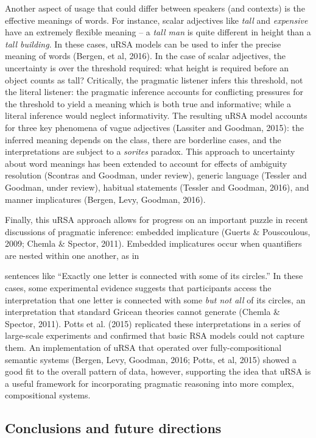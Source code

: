 \documentclass[]{elsarticle}
\begin{document}
Another aspect of usage that could differ between speakers (and
contexts) is the effective meanings of words. For instance, scalar
adjectives like \emph{tall} and \emph{expensive} have an extremely
flexible meaning -- a \emph{tall man} is quite different in height than
a \emph{tall building}. In these cases, uRSA models can be used to infer
the precise meaning of words (Bergen, et al, 2016). In the case of
scalar adjectives, the uncertainty is over the threshold required: what
height is required before an object counts as tall? Critically, the
pragmatic listener infers this threshold, not the literal listener: the
pragmatic inference accounts for conflicting pressures for the threshold
to yield a meaning which is both true and informative; while a literal
inference would neglect informativity. The resulting uRSA model accounts
for three key phenomena of vague adjectives (Lassiter and Goodman,
2015): the inferred meaning depends on the class, there are borderline
cases, and the interpretations are subject to a \emph{sorites} paradox.
This approach to uncertainty about word meanings has been extended to
account for effects of ambiguity resolution (Scontras and Goodman, under
review), generic language (Tessler and Goodman, under review), habitual
statements (Tessler and Goodman, 2016), and manner implicatures (Bergen,
Levy, Goodman, 2016).

Finally, this uRSA approach allows for progress on an important puzzle
in recent discussions of pragmatic inference: embedded implicature
(Guerts \& Pouscoulous, 2009; Chemla \& Spector, 2011). Embedded
implicatures occur when quantifiers are nested within one another, as in

sentences like ``Exactly one letter is connected with some of its
circles.'' In these cases, some experimental evidence suggests that
participants access the interpretation that one letter is connected with
some \emph{but not all} of its circles, an interpretation that standard
Gricean theories cannot generate (Chemla \& Spector, 2011). Potts et al.
(2015) replicated these interpretations in a series of large-scale
experiments and confirmed that basic RSA models could not capture them.
An implementation of uRSA that operated over fully-compositional
semantic systems (Bergen, Levy, Goodman, 2016; Potts, et al, 2015)
showed a good fit to the overall pattern of data, however, supporting
the idea that uRSA is a useful framework for incorporating pragmatic
reasoning into more complex, compositional systems.

\subsection{Conclusions and future
directions}\label{conclusions-and-future-directions}
\end{document}
